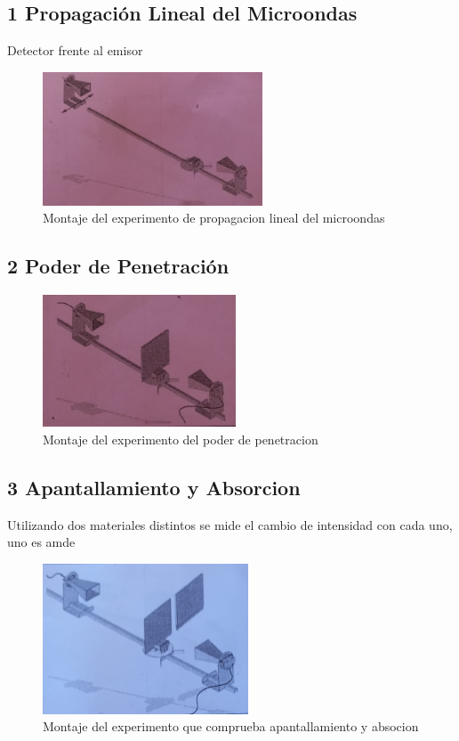 \documentclass[a4paper,twocolumn,10pt]{article}
\begin{document}
\subsection*{1 Propagación Lineal del Microondas}
Detector frente al emisor
\begin{figure}[H]
    \centering
    \includegraphics{MO_montaje/1.png}
    \caption{Montaje del experimento de propagacion lineal del microondas}
    \label{fig:proplineal}
\end{figure}

\subsection*{2 Poder de Penetración}

\begin{figure}[H]
    \centering
    \includegraphics{MO_montaje/2.png}
    \caption{Montaje del experimento del poder de penetracion}
    \label{fig:montpen}
\end{figure}

\subsection*{3 Apantallamiento y Absorcion}
Utilizando dos materiales distintos se mide el cambio de intensidad con cada uno, uno es amde
\begin{figure}[H]
    \centering
    \includegraphics{MO_montaje/3.png}
    \caption{Montaje del experimento que comprueba apantallamiento y absocion}
    \label{fig:montapant}
\end{figure}
\end{document}
